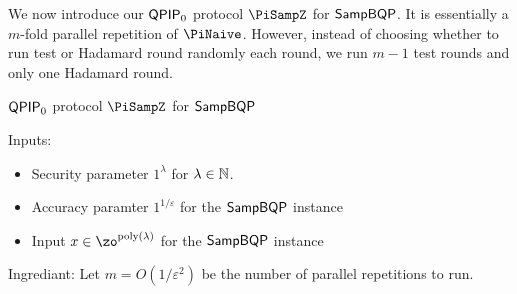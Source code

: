 
We now introduce our $\operatorname{\mathsf{QPIP}}_0$ protocol $\PiSampZ$ for $\operatorname{\mathsf{SampBQP}}$.
It is essentially a $m$-fold parallel repetition of $\PiNaive$.
However, instead of choosing whether to run test or Hadamard round randomly each round,
we run $m-1$ test rounds and only one Hadamard round.

\begin{protocol}{$\operatorname{\mathsf{QPIP}}_0$ protocol $\PiSampZ$ for $\operatorname{\mathsf{SampBQP}}$}
\label{proto:QPIP0samp}

Inputs:
	\begin{itemize}
		\item Security parameter $1^\lambda$ for $\lambda\in\mathbb{N}$.
		\item Accuracy paramter $1^{1/\varepsilon}$ for the $\operatorname{\mathsf{SampBQP}}$ instance
		\item Input $x\in\zo^{\poly(\lambda)}$ for the $\operatorname{\mathsf{SampBQP}}$ instance
	\end{itemize}

Ingrediant: Let $m=O(1/\varepsilon^2)$ be the number of parallel repetitions to run.
    

\end{protocol}
